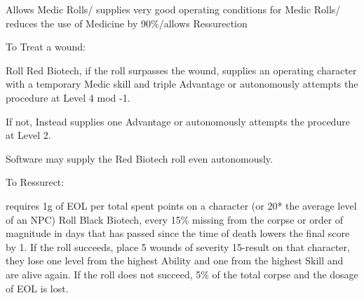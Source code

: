 Allows Medic Rolls/ supplies very good operating conditions for Medic Rolls/ reduces the use of Medicine by 90\%/allows Ressurection\par
To Treat a wound:\par
Roll Red Biotech, if the roll surpasses the wound, supplies an operating character with a temporary Medic skill and
triple Advantage or autonomously attempts the procedure at Level 4 mod -1.\par
If not, Instead supplies one Advantage or autonomously attempts the procedure at Level 2.\par
Software may supply the Red Biotech roll even autonomously.\par
To Ressurect:\par
requires 1g of EOL per total spent points on a character (or 20* the average level of an NPC)
Roll Black Biotech, every 15\% missing from the corpse or order of magnitude in days that has passed since the time of death
lowers the final score by 1.
If the roll succeeds, place 5 wounds of severity 15-result on that character, they lose
one level from the highest Ability and one from the highest Skill and are alive again.
If the roll does not succeed,
5\% of the total corpse and the dosage of EOL is lost.

